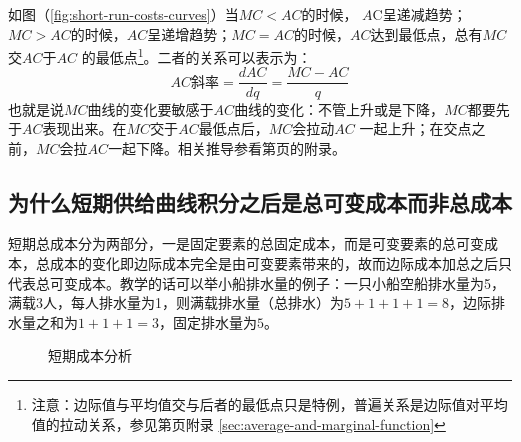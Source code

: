如图（\ref{fig:short-run-costs-curves}）当$MC<AC$的时候， $A$C呈递减趋势；$MC>AC$的时候，$AC$呈递增趋势；$MC=AC$的时候，$AC$达到最低点，总有$MC$交$AC$于$AC$ 的最低点\footnote{%
注意：边际值与平均值交与后者的最低点只是特例，普遍关系是边际值对平均值的拉动关系，参见第\pageref{sec:average-and-marginal-function}页附录 \ref{sec:average-and-marginal-function}}。二者的关系可以表示为：
\begin{equation}
AC斜率=\frac{dAC}{dq} = \frac{MC-AC}{q}
\label{eq:average-and-marginal}
\end{equation}
也就是说$MC$曲线的变化要敏感于$AC$曲线的变化：不管上升或是下降，$MC$都要先于$AC$表现出来。在$MC$交于$AC$最低点后，$MC$会拉动$AC$ 一起上升；在交点之前，$MC$会拉$AC$一起下降。相关推导参看第\pageref{sec:average-and-marginal-function}页的附录。

\subsection{为什么短期供给曲线积分之后是总可变成本而非总成本}

短期总成本分为两部分，一是固定要素的总固定成本，而是可变要素的总可变成本，总成本的变化即边际成本完全是由可变要素带来的，故而边际成本加总之后只代表总可变成本。教学的话可以举小船排水量的例子：一只小船空船排水量为5，满载3人，每人排水量为1，则满载排水量（总排水）为$5+1+1+1=8$，边际排水量之和为$1+1+1=3$，固定排水量为$5$。

\begin{figure}[!h]
\colorbox{black!3}{\parbox{\linewidth-2\fboxsep}{%
\centering
{}
\caption{短期成本分析}
\label{fig:analysis-of-short-term-cost}
}}
\end{figure}

